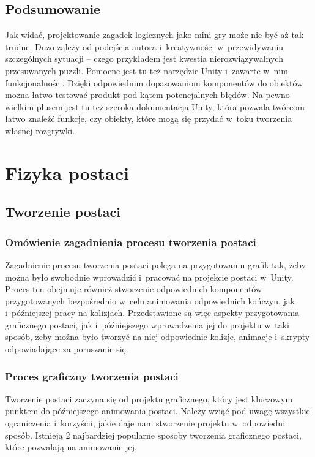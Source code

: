 \documentclass[oneside,polski,logo]{amuthesis}
\begin{document}
\section{Podsumowanie}
\par Jak widać, projektowanie zagadek logicznych jako mini-gry może nie być aż tak trudne. Dużo zależy od podejścia autora i~kreatywności w~przewidywaniu szczególnych sytuacji – czego przykładem jest kwestia nierozwiązywalnych przesuwanych puzzli. Pomocne jest tu też narzędzie Unity i~zawarte w~nim funkcjonalności. Dzięki odpowiednim dopasowaniom komponentów do obiektów można łatwo testować produkt pod kątem potencjalnych błędów. Na pewno wielkim plusem jest tu też szeroka dokumentacja Unity, która pozwala twórcom łatwo znaleźć funkcje, czy obiekty, które mogą się przydać w~toku tworzenia własnej rozgrywki.

\chapter{Fizyka postaci}
\section{Tworzenie postaci}
\subsection{Omówienie zagadnienia procesu tworzenia postaci}
Zagadnienie procesu tworzenia postaci polega na przygotowaniu grafik tak, żeby można było swobodnie wprowadzić i~pracować na projekcie postaci w~Unity. Proces ten obejmuje również stworzenie odpowiednich komponentów przygotowanych bezpośrednio w~celu animowania odpowiednich kończyn, jak i~późniejszej pracy na kolizjach. Przedstawione są więc aspekty przygotowania graficznego postaci, jak i~późniejszego wprowadzenia jej do projektu w~taki sposób, żeby można było tworzyć na niej odpowiednie kolizje, animacje i~skrypty odpowiadające za poruszanie się.
\subsection{Proces graficzny tworzenia postaci}
Tworzenie postaci zaczyna się od projektu graficznego, który jest kluczowym punktem do późniejszego animowania postaci. Należy wziąć pod uwagę wszystkie ograniczenia i~korzyścii, jakie daje nam stworzenie projektu w~odpowiedni sposób. Istnieją 2 najbardziej popularne sposoby tworzenia graficznego postaci, które pozwalają na animowanie jej.
\end{document}
